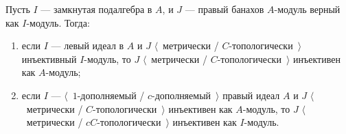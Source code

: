 \begin{proposition}\label{MetTopInjUnderChangeOfAlg} Пусть $I$ --- замкнутая
подалгебра в $A$, и $J$ --- правый банахов $A$-модуль верный как $I$-модуль.
Тогда:
\begin{enumerate}[label = (\roman*)]
    \item если $I$ --- левый идеал в $A$ и $J$ $\langle$~метрически /
    $C$-топологически~$\rangle$ инъективный $I$-модуль, то $J$
    $\langle$~метрически / $C$-топологически~$\rangle$ инъективен как
    $A$-модуль;

    \item если $I$ --- $\langle$~$1$-дополняемый / $c$-дополняемый~$\rangle$
    правый идеал $A$ и $J$ $\langle$~метрически / $C$-топологически~$\rangle$
    инъективен как $A$-модуль, то $J$ $\langle$~метрически /
    $cC$-топологически~$\rangle$ инъективен как $I$-модуль.
\end{enumerate}
\end{proposition}
